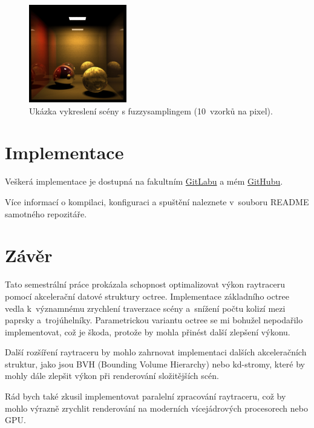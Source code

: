 \documentclass[10pt,a4paper,twocolumn]{article}
\begin{document}
\begin{figure}[H]
    \centering
    \includegraphics[width=0.38\textwidth]{images/sphere_render_sampling_10.png}
    \caption{Ukázka vykreslení scény s fuzzysamplingem (10~vzorků na pixel).}
\end{figure}


\section{Implementace}

Veškerá implementace je dostupná na fakultním \href{https://gitlab.fit.cvut.cz/votruja6/pg1-raytracer#}{GitLabu} a mém \href{https://github.com/MasterVotr/PG1-raytracer}{GitHubu}.

Více informací o kompilaci, konfiguraci a spuštění naleznete v~souboru README samotného repozitáře.


\section{Závěr}

Tato semestrální práce prokázala schopnost optimalizovat výkon raytraceru pomocí akcelerační datové struktury octree. Implementace základního octree vedla k~významnému zrychlení traverzace scény a~snížení počtu kolizí mezi paprsky a~trojúhelníky. Parametrickou variantu octree se mi bohužel nepodařilo implementovat, což je škoda, protože by mohla přinést další zlepšení výkonu.

Další rozšíření raytraceru by mohlo zahrnovat implementaci dalších akceleračních struktur, jako jsou BVH (Bounding Volume Hierarchy) nebo kd-stromy, které by mohly dále zlepšit výkon při renderování složitějších scén.

Rád bych také zkusil implementovat paralelní zpracování raytraceru, což by mohlo výrazně zrychlit renderování na moderních vícejádrových procesorech nebo GPU.
\end{document}
